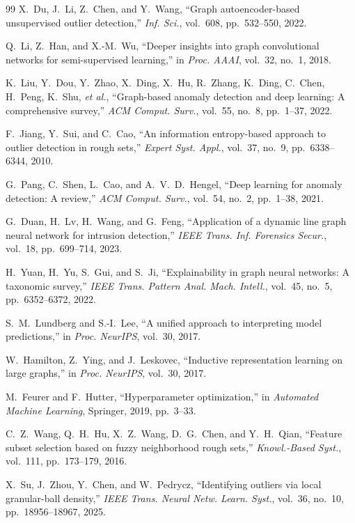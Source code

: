 \documentclass[lettersize,journal]{IEEEtran}
\begin{document}
\begin{thebibliography}{99}
X.~Du, J.~Li, Z.~Chen, and Y.~Wang, ``Graph autoencoder-based unsupervised outlier detection,''
\textit{Inf. Sci.}, vol.~608, pp.~532--550, 2022.

Q.~Li, Z.~Han, and X.-M.~Wu, ``Deeper insights into graph convolutional networks for
semi-supervised learning,'' in \textit{Proc. AAAI}, vol.~32, no.~1, 2018.

K.~Liu, Y.~Dou, Y.~Zhao, X.~Ding, X.~Hu, R.~Zhang, K.~Ding, C.~Chen, H.~Peng, K.~Shu,
\textit{et al.}, ``Graph-based anomaly detection and deep learning: A comprehensive survey,''
\textit{ACM Comput. Surv.}, vol.~55, no.~8, pp.~1--37, 2022.

F.~Jiang, Y.~Sui, and C.~Cao, ``An information entropy-based approach to outlier detection
in rough sets,'' \textit{Expert Syst. Appl.}, vol.~37, no.~9, pp.~6338--6344, 2010.

G.~Pang, C.~Shen, L.~Cao, and A.~V.~D.~Hengel, ``Deep learning for anomaly detection: A review,''
\textit{ACM Comput. Surv.}, vol.~54, no.~2, pp.~1--38, 2021.

G.~Duan, H.~Lv, H.~Wang, and G.~Feng, ``Application of a dynamic line graph neural network
for intrusion detection,'' \textit{IEEE Trans. Inf. Forensics Secur.}, vol.~18, pp.~699--714, 2023.

H.~Yuan, H.~Yu, S.~Gui, and S.~Ji, ``Explainability in graph neural networks: A taxonomic survey,''
\textit{IEEE Trans. Pattern Anal. Mach. Intell.}, vol.~45, no.~5, pp.~6352--6372, 2022.

S.~M.~Lundberg and S.-I.~Lee, ``A unified approach to interpreting model predictions,''
in \textit{Proc. NeurIPS}, vol.~30, 2017.

W.~Hamilton, Z.~Ying, and J.~Leskovec, ``Inductive representation learning on large graphs,''
in \textit{Proc. NeurIPS}, vol.~30, 2017.

M.~Feurer and F.~Hutter, ``Hyperparameter optimization,'' in \textit{Automated Machine Learning},
Springer, 2019, pp.~3--33.

C.~Z.~Wang, Q.~H.~Hu, X.~Z.~Wang, D.~G.~Chen, and Y.~H.~Qian, ``Feature subset selection
based on fuzzy neighborhood rough sets,'' \textit{Knowl.-Based Syst.}, vol.~111, pp.~173--179, 2016.

X.~Su, J.~Zhou, Y.~Chen, and W.~Pedrycz, ``Identifying outliers via local granular-ball density,''
\textit{IEEE Trans. Neural Netw. Learn. Syst.}, vol.~36, no.~10, pp.~18956--18967, 2025.


\end{thebibliography}
\end{document}
